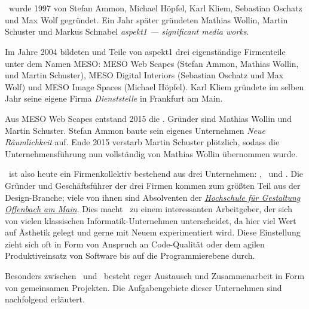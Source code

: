 \section{\meso}
\label{sec:e_meso}

\meso~wurde 1997 von Stefan Ammon, Michael Höpfel, Karl Kliem, Sebastian
Oschatz und Max Wolf gegründet. Ein Jahr später gründeten Mathias Wollin,
Martin Schuster und Markus Schnabel \emph{aspekt1 --- significant media works}.

Im Jahre 2004 bildeten \meso und Teile von aspekt1 drei eigenständige
Firmenteile unter dem Namen MESO: MESO Web Scapes (Stefan Ammon, Mathias
Wollin, und Martin Schuster), MESO Digital Interiors (Sebastian Oschatz und Max
Wolf) und MESO Image Spaces (Michael Höpfel). Karl Kliem gründete im selben
Jahr seine eigene Firma \emph{Dienststelle} in Frankfurt am Main.

Aus MESO Web Scapes entstand 2015 die \mesods. Gründer sind  Mathias Wollin und
Martin Schuster.  Stefan Ammon baute sein eigenes Unternehmen \emph{Neue
Räumlichkeit} auf.  Ende 2015 verstarb Martin Schuster plötzlich, sodass die
Unternehmensführung nun vollständig von Mathias Wollin übernommen wurde.

\meso~ist also heute ein Firmenkollektiv bestehend aus drei Unternehmen:
\mesodi, \mesods~und \mesois.  Die Gründer und Geschäftsführer der drei Firmen
kommen zum größten Teil aus der Design-Branche; viele von ihnen sind Absolventen
der \emph{\href{http://hfg-offenbach.de}{Hochschule für Gestaltung Offenbach am
Main}}.  Dies macht \meso~zu einem interessanten Arbeitgeber, der sich von
vielen klassischen Informatik-Unternehmen unterscheidet, da hier viel Wert auf
Ästhetik gelegt und gerne mit Neuem experimentiert wird.  Diese Einstellung
zieht sich oft in Form von Anspruch an Code-Qualität oder dem agilen
Produktiveinsatz von Software bis auf die Programmierebene durch.

Besonders zwischen \mesodi~und \mesods~besteht reger Austausch und
Zusammenarbeit in Form von gemeinsamen Projekten.  Die Aufgabengebiete dieser
Unternehmen sind nachfolgend erläutert.



